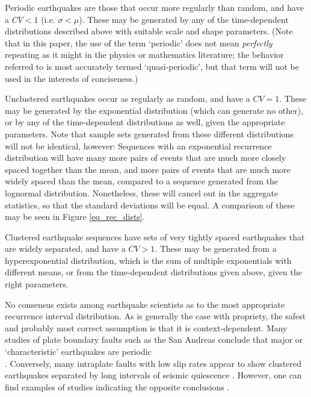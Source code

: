\documentclass[se, manuscript]{copernicus}
\begin{document}
Periodic earthquakes are those that occur more regularly than random,
and have a \(CV < 1\) (i.e. \(\sigma < \mu\)). These may be generated
by any of the time-dependent distributions described above with suitable
scale and shape parameters. (Note that in this paper, the use of the
term `periodic' does not mean \emph{perfectly} repeating as it might in
the physics or mathematics literature; the behavior referred to is most 
accurately termed `quasi-periodic', but that term will not be used in the 
interests of conciseness.)

Unclustered earthquakes occur as regularly as random, and have a
\(CV=1\). These may be generated by the exponential distribution (which
can generate no other), or by any of the time-dependent distributions as
well, given the appropriate parameters. Note that sample sets generated
from these different distributions will not be identical, however:
Sequences with an exponential recurrence distribution will have many
more pairs of events that are much more closely spaced together than the
mean, and more pairs of events that are much more widely spaced than the
mean, compared to a sequence generated from the lognormal distribution.
Nonetheless, these will cancel out in the aggregate statistics, so that
the standard deviations will be equal. A comparison of these may be seen
in Figure \ref{eq_rec_dists}.

Clustered earthquake sequences have sets of very tightly spaced
earthquakes that are widely separated, and have a \(CV>1\). These may
be generated from a hyperexponential distribution, which is the sum of
multiple exponentials with different means, or from the time-dependent
distributions given above, given the right parameters.

No consensus exists among earthquake scientists as to the most
appropriate recurrence interval distribution. As is generally the case
with propriety, the safest and probably most correct assumption is that
it is context-dependent. Many studies of plate boundary faults such as
the San Andreas conclude that major or `characteristic' earthquakes are
periodic\\
\citep[e.g.,][]{berryman_major_2012, scharer_quasi-periodic_2010}.
Conversely, many intraplate faults with low slip rates appear to show
clustered earthquakes separated by long intervals of seismic quiescence
\citep[e.g.,][]{clark_long-term_2012}. However, one can find examples of
studies indicating the opposite conclusions
\citep{tuttle_earthquake_2002, grant_paleoseismic_1994}.
\end{document}
